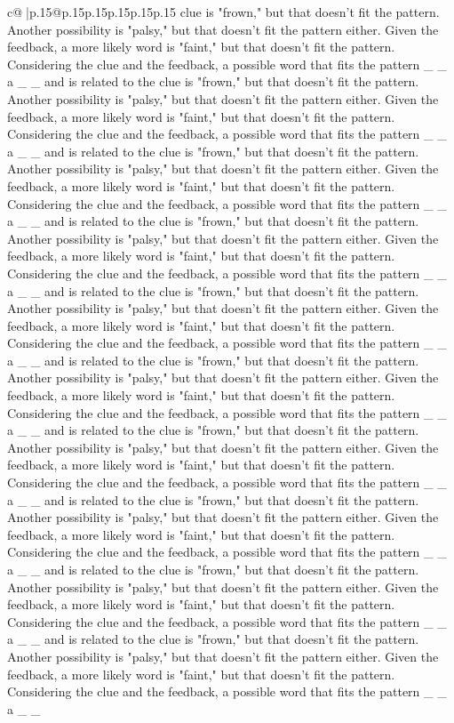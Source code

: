 \documentclass{article}
\begin{document}
{\begin{supertabular}{c@{$\;$}|p{.15\linewidth}@{}p{.15\linewidth}p{.15\linewidth}p{.15\linewidth}p{.15\linewidth}p{.15\linewidth}}
{{{clue is "frown," but that doesn't fit the pattern. Another possibility is "palsy," but that doesn't fit the pattern either. Given the feedback, a more likely word is "faint," but that doesn't fit the pattern. Considering the clue and the feedback, a possible word that fits the pattern \_ \_ a \_ \_ and is related to the clue is "frown," but that doesn't fit the pattern. Another possibility is "palsy," but that doesn't fit the pattern either. Given the feedback, a more likely word is "faint," but that doesn't fit the pattern. Considering the clue and the feedback, a possible word that fits the pattern \_ \_ a \_ \_ and is related to the clue is "frown," but that doesn't fit the pattern. Another possibility is "palsy," but that doesn't fit the pattern either. Given the feedback, a more likely word is "faint," but that doesn't fit the pattern. Considering the clue and the feedback, a possible word that fits the pattern \_ \_ a \_ \_ and is related to the clue is "frown," but that doesn't fit the pattern. Another possibility is "palsy," but that doesn't fit the pattern either. Given the feedback, a more likely word is "faint," but that doesn't fit the pattern. Considering the clue and the feedback, a possible word that fits the pattern \_ \_ a \_ \_ and is related to the clue is "frown," but that doesn't fit the pattern. Another possibility is "palsy," but that doesn't fit the pattern either. Given the feedback, a more likely word is "faint," but that doesn't fit the pattern. Considering the clue and the feedback, a possible word that fits the pattern \_ \_ a \_ \_ and is related to the clue is "frown," but that doesn't fit the pattern. Another possibility is "palsy," but that doesn't fit the pattern either. Given the feedback, a more likely word is "faint," but that doesn't fit the pattern. Considering the clue and the feedback, a possible word that fits the pattern \_ \_ a \_ \_ and is related to the clue is "frown," but that doesn't fit the pattern. Another possibility is "palsy," but that doesn't fit the pattern either. Given the feedback, a more likely word is "faint," but that doesn't fit the pattern. Considering the clue and the feedback, a possible word that fits the pattern \_ \_ a \_ \_ and is related to the clue is "frown," but that doesn't fit the pattern. Another possibility is "palsy," but that doesn't fit the pattern either. Given the feedback, a more likely word is "faint," but that doesn't fit the pattern. Considering the clue and the feedback, a possible word that fits the pattern \_ \_ a \_ \_ and is related to the clue is "frown," but that doesn't fit the pattern. Another possibility is "palsy," but that doesn't fit the pattern either. Given the feedback, a more likely word is "faint," but that doesn't fit the pattern. Considering the clue and the feedback, a possible word that fits the pattern \_ \_ a \_ \_ and is related to the clue is "frown," but that doesn't fit the pattern. Another possibility is "palsy," but that doesn't fit the pattern either. Given the feedback, a more likely word is "faint," but that doesn't fit the pattern. Considering the clue and the feedback, a possible word that fits the pattern \_ \_ a \_ \_ }}}
\end{supertabular}}
\end{document}
